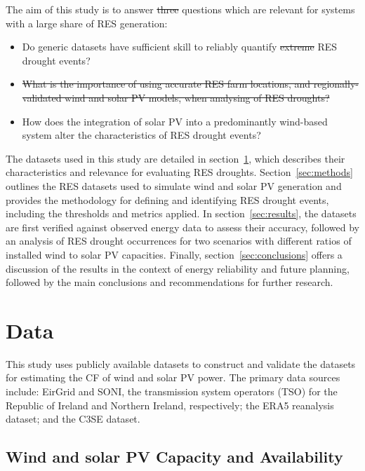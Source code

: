\documentclass[preprint, 12pt]{elsarticle}
\providecommand{\DIFadd}[1]{{\protect\color{blue}\uwave{#1}}} %
\providecommand{\DIFdel}[1]{{\protect\color{red}\sout{#1}}}                      %
\providecommand{\DIFaddbegin}{} %
\providecommand{\DIFaddend}{} %
\providecommand{\DIFdelbegin}{} %
\providecommand{\DIFdelend}{} %
\begin{document}
The aim of this study is to answer \DIFdelbegin \DIFdel{three }\DIFdelend \DIFaddbegin \DIFadd{two }\DIFaddend questions which are relevant for systems with a large share of RES generation:
\begin{itemize}
	\item Do generic datasets have sufficient skill to reliably quantify \DIFdelbegin \DIFdel{extreme }\DIFdelend RES drought events?
	\item \DIFdelbegin \DIFdel{What is the importance of using accurate RES farm locations, and regionally-validated wind and solar PV models, when analysing of RES droughts?
	}%
\item%
\DIFdelend How does the integration of solar PV \DIFaddbegin \DIFadd{capacity }\DIFaddend into a predominantly wind-based system alter the characteristics of RES drought events?
\end{itemize}

The datasets used in this study are detailed in section~\ref{sec:data}, which describes their characteristics and relevance for evaluating RES droughts. Section~\ref{sec:methods} outlines the RES datasets used to simulate wind and solar PV generation and provides the methodology for defining and identifying RES drought events, including the thresholds and metrics applied. In section~\ref{sec:results}, the datasets are first verified against observed energy data to assess their accuracy, followed by an analysis of RES drought occurrences for two scenarios with different ratios of installed wind to solar PV capacities. Finally, section~\ref{sec:conclusions} offers a discussion of the results in the context of energy reliability and future planning, followed by the main conclusions and recommendations for further research.

\section{Data}
\label{sec:data}

This study uses publicly available datasets to construct and validate the datasets for estimating the CF of wind and solar PV power. The primary data sources include: EirGrid and SONI, the transmission system operators (TSO) for the Republic of Ireland and Northern Ireland, respectively; the ERA5 reanalysis dataset; and the C3SE dataset.

\subsection{Wind and solar PV Capacity and Availability}
\label{sec:eirgrid}
\end{document}
